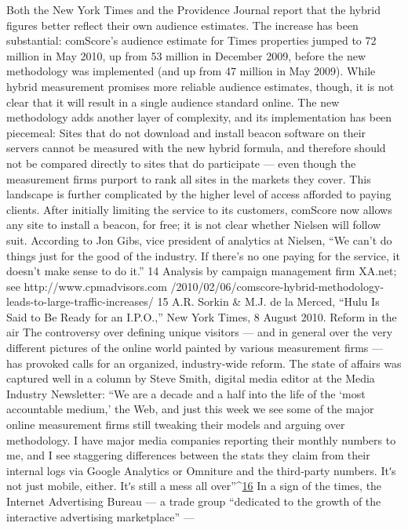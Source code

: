 Both the New York Times and the Providence Journal report that the hybrid
figures better reflect their own audience estimates. The increase has been
substantial: comScore’s audience estimate for Times properties jumped to
72 million in May 2010, up from 53 million in December 2009, before the
new methodology was implemented (and up from 47 million in May
2009).
While hybrid measurement promises more reliable audience estimates,
though, it is not clear that it will result in a single audience standard
online. The new methodology adds another layer of complexity, and its
implementation has been piecemeal: Sites that do not download and
install beacon software on their servers cannot be measured with the new
hybrid formula, and therefore should not be compared directly to sites
that do participate — even though the measurement firms purport to rank
all sites in the markets they cover.
This landscape is further complicated by the higher level of access
afforded to paying clients. After initially limiting the service to its
customers, comScore now allows any site to install a beacon, for free; it is
not clear whether Nielsen will follow suit. According to Jon Gibs, vice
president of analytics at Nielsen, ``We can’t do things just for the good of
the industry. If there’s no one paying for the service, it doesn’t make sense
to do it.''
14 Analysis by campaign management firm XA.net; see http://www.cpmadvisors.com
/2010/02/06/comscore-hybrid-methodology-leads-to-large-traffic-increases/
15 A.R. Sorkin & M.J. de la Merced, ``Hulu Is Said to Be Ready for an I.P.O.,'' New
York Times, 8 August 2010.
Reform in the air
The controversy over defining unique visitors — and in general over the
very different pictures of the online world painted by various
measurement firms — has provoked calls for an organized, industry‐wide
reform. The state of affairs was captured well in a column by Steve Smith,
digital media editor at the Media Industry Newsletter:
``We are a decade and a half into the life of the ‘most accountable
medium,’ the Web, and just this week we see some of the major
online measurement firms still tweaking their models and arguing
over methodology. I have major media companies reporting their
monthly numbers to me, and I see staggering differences between
the stats they claim from their internal logs via Google Analytics or
Omniture and the third‐party numbers. Itʹs not just mobile, either.
Itʹs still a mess all over''^{\href{#endnotes}{16}}
In a sign of the times, the Internet Advertising Bureau — a trade group
``dedicated to the growth of the interactive advertising marketplace'' —
